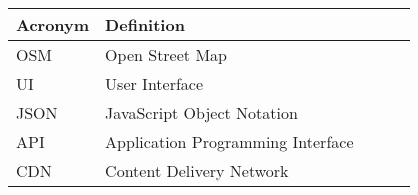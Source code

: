 \begin{table}[H]
\centering
\label{Acronym}
\begin{tabular}{l|llll}
\textbf{Acronym} & \textbf{Definition} &  \\ \hline
OSM         & Open Street Map & \\
UI         & User Interface &  \\
JSON		& JavaScript Object Notation & \\  
API		& Application Programming Interface & \\
CDN		& Content Delivery Network & \\  
\end{tabular}
\end{table}

